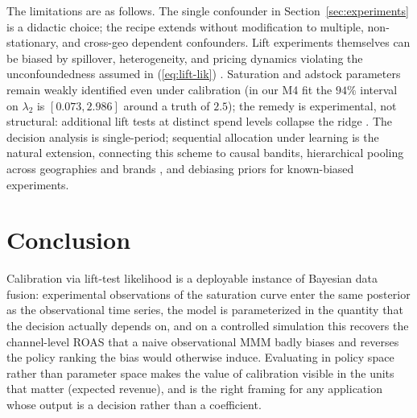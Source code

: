 \documentclass{uai2026} %
\begin{document}
The limitations are as follows.
The single confounder in Section~\ref{sec:experiments} is a didactic choice; the recipe extends without modification to multiple, non-stationary, and cross-geo dependent confounders.
Lift experiments themselves can be biased by spillover, heterogeneity, and pricing dynamics violating the unconfoundedness assumed in (\ref{eq:lift-lik}) \citep{cooprider2023amazon}.
Saturation and adstock parameters remain weakly identified even under calibration (in our M4 fit the $94\%$ interval on $\lambda_2$ is $[0.073, 2.986]$ around a truth of $2.5$); the remedy is experimental, not structural: additional lift tests at distinct spend levels collapse the ridge \citep{vincent2026liftasymptote}.
The decision analysis is single-period; sequential allocation under learning is the natural extension, connecting this scheme to causal bandits, hierarchical pooling across geographies and brands \citep{masoero2025multiple}, and debiasing priors for known-biased experiments.

\section{Conclusion}\label{sec:conclusion}

Calibration via lift-test likelihood is a deployable instance of Bayesian data fusion: experimental observations of the saturation curve enter the same posterior as the observational time series, the model is parameterized in the quantity that the decision actually depends on, and on a controlled simulation this recovers the channel-level ROAS that a naive observational MMM badly biases and reverses the policy ranking the bias would otherwise induce.
Evaluating in policy space rather than parameter space makes the value of calibration visible in the units that matter (expected revenue), and is the right framing for any application whose output is a decision rather than a coefficient.


\end{document}
